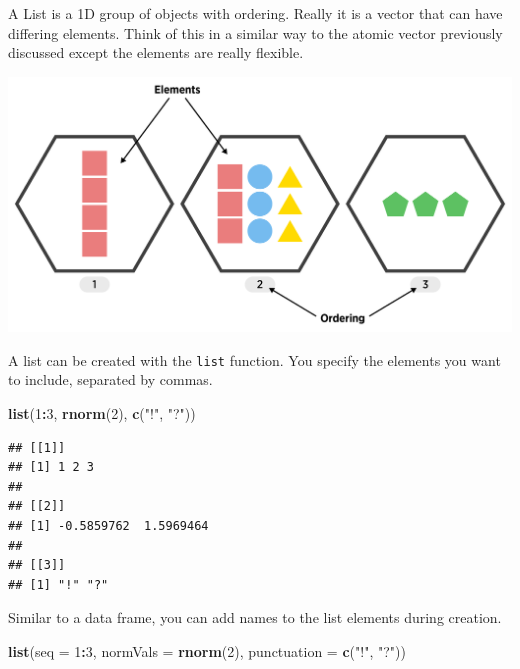 \documentclass[
]{book}
\newenvironment{Shaded}{\begin{snugshade}}{\end{snugshade}}
\newcommand{\DataTypeTok}[1]{\textcolor[rgb]{0.13,0.29,0.53}{#1}}
\newcommand{\DecValTok}[1]{\textcolor[rgb]{0.00,0.00,0.81}{#1}}
\newcommand{\KeywordTok}[1]{\textcolor[rgb]{0.13,0.29,0.53}{\textbf{#1}}}
\newcommand{\NormalTok}[1]{#1}
\newcommand{\OperatorTok}[1]{\textcolor[rgb]{0.81,0.36,0.00}{\textbf{#1}}}
\newcommand{\StringTok}[1]{\textcolor[rgb]{0.31,0.60,0.02}{#1}}
\theoremstyle{definition}
\theoremstyle{definition}
\theoremstyle{definition}
\theoremstyle{remark}
\begin{document}
A List is a 1D group of objects with ordering. Really it is a vector that can have differing elements. Think of this in a similar way to the atomic vector previously discussed except the elements are really flexible.

\begin{center}\includegraphics[width=0.8\linewidth]{img/listVisualF} \end{center}

A list can be created with the \texttt{list} function. You specify the elements you want to include, separated by commas.

\begin{Shaded}
\begin{Highlighting}[]
\KeywordTok{list}\NormalTok{(}\DecValTok{1}\OperatorTok{:}\DecValTok{3}\NormalTok{, }\KeywordTok{rnorm}\NormalTok{(}\DecValTok{2}\NormalTok{), }\KeywordTok{c}\NormalTok{(}\StringTok{"!"}\NormalTok{, }\StringTok{"?"}\NormalTok{))}
\end{Highlighting}
\end{Shaded}

\begin{verbatim}
## [[1]]
## [1] 1 2 3
## 
## [[2]]
## [1] -0.5859762  1.5969464
## 
## [[3]]
## [1] "!" "?"
\end{verbatim}

Similar to a data frame, you can add names to the list elements during creation.

\begin{Shaded}
\begin{Highlighting}[]
\KeywordTok{list}\NormalTok{(}\DataTypeTok{seq =} \DecValTok{1}\OperatorTok{:}\DecValTok{3}\NormalTok{, }\DataTypeTok{normVals =} \KeywordTok{rnorm}\NormalTok{(}\DecValTok{2}\NormalTok{), }\DataTypeTok{punctuation =} \KeywordTok{c}\NormalTok{(}\StringTok{"!"}\NormalTok{, }\StringTok{"?"}\NormalTok{))}
\end{Highlighting}
\end{Shaded}
\end{document}
